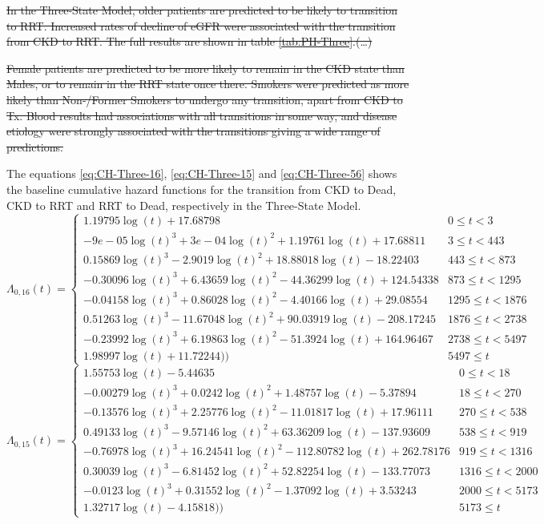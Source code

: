 \documentclass[12pt,PhD,twoside,openright]{muthesis}
\begin{document}
\sout{In the Three-State Model, older patients are predicted to be likely to transition to RRT. Increased rates of decline of eGFR were associated with the transition from CKD to RRT. The full results are shown in table \ref{tab:PH-Three}.(\ldots)}

\sout{Female patients are predicted to be more likely to remain in the CKD state than Males, or to remain in the RRT state once there. Smokers were predicted as more likely than Non-/Former Smokers to undergo any transition, apart from CKD to Tx. Blood results had associations with all transitions in some way, and disease etiology were strongly associated with the transitions giving a wide range of predictions.}

The equations \eqref{eq:CH-Three-16}, \eqref{eq:CH-Three-15} and \eqref{eq:CH-Three-56} shows the baseline cumulative hazard functions for the transition from CKD to Dead, CKD to RRT and RRT to Dead, respectively in the Three-State Model.
\begin{equation}
\Lambda_{0,16}(t)=\begin{cases} 1.19795\log(t)+17.68798 & 0 \le t < 3 \\ -9e-05\log(t)^3+3e-04\log(t)^2+1.19761\log(t)+17.68811 & 3 \le t < 443 \\ 0.15869\log(t)^3-2.9019\log(t)^2+18.88018\log(t)-18.22403 & 443 \le t < 873 \\ -0.30096\log(t)^3+6.43659\log(t)^2-44.36299\log(t)+124.54338 & 873 \le t < 1295 \\ -0.04158\log(t)^3+0.86028\log(t)^2-4.40166\log(t)+29.08554 & 1295 \le t < 1876 \\ 0.51263\log(t)^3-11.67048\log(t)^2+90.03919\log(t)-208.17245 & 1876 \le t < 2738 \\ -0.23992\log(t)^3+6.19863\log(t)^2-51.3924\log(t)+164.96467 & 2738 \le t < 5497 \\ 1.98997\log(t)+11.72244)) & 5497 \le t \label{eq:CH-Three-16}\end{cases}
\end{equation}
\begin{equation}
\Lambda_{0,15}(t)=\begin{cases} 1.55753\log(t)-5.44635 & 0 \le t < 18 \\ -0.00279\log(t)^3+0.0242\log(t)^2+1.48757\log(t)-5.37894 & 18 \le t < 270 \\ -0.13576\log(t)^3+2.25776\log(t)^2-11.01817\log(t)+17.96111 & 270 \le t < 538 \\ 0.49133\log(t)^3-9.57146\log(t)^2+63.36209\log(t)-137.93609 & 538 \le t < 919 \\ -0.76978\log(t)^3+16.24541\log(t)^2-112.80782\log(t)+262.78176 & 919 \le t < 1316 \\ 0.30039\log(t)^3-6.81452\log(t)^2+52.82254\log(t)-133.77073 & 1316 \le t < 2000 \\ -0.0123\log(t)^3+0.31552\log(t)^2-1.37092\log(t)+3.53243 & 2000 \le t < 5173 \\ 1.32717\log(t)-4.15818)) & 5173 \le t \label{eq:CH-Three-15}\end{cases}
\end{equation}
\end{document}
